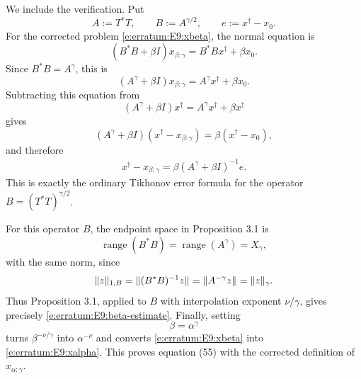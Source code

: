 We include the verification.  Put
\[
        A:=T^*T,
        \qquad
        B:=A^{\gamma/2},
        \qquad
        e:=x^\dag-x_0 .
\]
For the corrected problem \eqref{e:erratum:E9:xbeta}, the normal equation is
\[
        (B^*B+\beta I)x_{\beta:\gamma}
        =
        B^*B x^\dag+\beta x_0 .
\]
Since $B^*B=A^\gamma$, this is
\[
        (A^\gamma+\beta I)x_{\beta:\gamma}
        =
        A^\gamma x^\dag+\beta x_0 .
\]
Subtracting this equation from
\[
        (A^\gamma+\beta I)x^\dag
        =
        A^\gamma x^\dag+\beta x^\dag
\]
gives
\[
        (A^\gamma+\beta I)(x^\dag-x_{\beta:\gamma})
        =
        \beta (x^\dag-x_0),
\]
and therefore
\begin{align}
\label{e:erratum:E9:error-filter}
        x^\dag-x_{\beta:\gamma}
        =
        \beta(A^\gamma+\beta I)^{-1}e .
\end{align}
This is exactly the ordinary Tikhonov error formula for the operator
$B=(T^*T)^{\gamma/2}$.

For this operator $B$, the endpoint space in Proposition 3.1 is
\[
        \operatorname{range}(B^*B)
        =
        \operatorname{range}(A^\gamma)
        =
        X_\gamma,
\]
with the same norm, since
\[
        \| z \|_{ 1,B }
        =
        \| (B^*B)^{-1}z \|_{  }
        =
        \| A^{-\gamma}z \|_{  }
        =
        \| z \|_{ \gamma } .
\]
Thus Proposition 3.1, applied to $B$ with interpolation exponent
$\nu/\gamma$, gives precisely \eqref{e:erratum:E9:beta-estimate}.  Finally,
setting
\[
        \beta=\alpha^\gamma
\]
turns $\beta^{-\nu/\gamma}$ into $\alpha^{-\nu}$ and converts
\eqref{e:erratum:E9:xbeta} into \eqref{e:erratum:E9:xalpha}.  This proves
equation (55) with the corrected definition of $x_{\alpha:\gamma}$.
